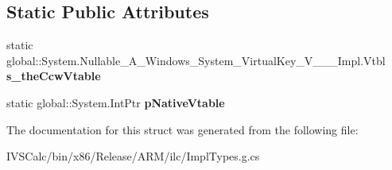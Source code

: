 \subsection*{Static Public Attributes}
\begin{DoxyCompactItemize}
\item 
\mbox{\label{struct_system_1_1_nullable___a___windows___system___virtual_key___v_______impl_1_1_vtbl_a58d673dce03929f57082e2b728e2746a}} 
static global\+::\+System.\+Nullable\+\_\+\+A\+\_\+\+Windows\+\_\+\+System\+\_\+\+Virtual\+Key\+\_\+\+V\+\_\+\+\_\+\+\_\+\+Impl.\+Vtbl {\bfseries s\+\_\+the\+Ccw\+Vtable}
\item 
\mbox{\label{struct_system_1_1_nullable___a___windows___system___virtual_key___v_______impl_1_1_vtbl_a486d8923d1ede6b1c5dac078a1f38c49}} 
static global\+::\+System.\+Int\+Ptr {\bfseries p\+Native\+Vtable}
\end{DoxyCompactItemize}


The documentation for this struct was generated from the following file\+:\begin{DoxyCompactItemize}
\item 
I\+V\+S\+Calc/bin/x86/\+Release/\+A\+R\+M/ilc/Impl\+Types.\+g.\+cs\end{DoxyCompactItemize}
